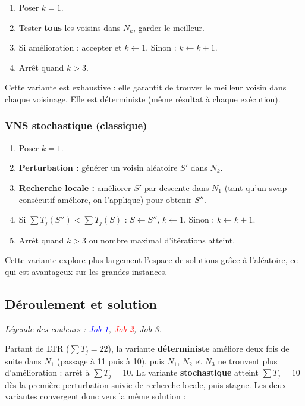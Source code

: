 \begin{enumerate}
    \item Poser $k = 1$.
    \item Tester \textbf{tous} les voisins dans $N_k$, garder le meilleur.
    \item Si amélioration : accepter et $k \leftarrow 1$. Sinon : $k \leftarrow k+1$.
    \item Arrêt quand $k > 3$.
\end{enumerate}

Cette variante est exhaustive : elle garantit de trouver le meilleur voisin dans chaque voisinage. Elle est déterministe (même résultat à chaque exécution).

\subsubsection{VNS stochastique (classique)}

\begin{enumerate}
    \item Poser $k = 1$.
    \item \textbf{Perturbation :} générer un voisin aléatoire $S'$ dans $N_k$.
    \item \textbf{Recherche locale :} améliorer $S'$ par descente dans $N_1$ (tant qu'un swap consécutif améliore, on l'applique) pour obtenir $S''$.
    \item Si $\sum T_j(S'') < \sum T_j(S)$ : $S \leftarrow S''$, $k \leftarrow 1$. Sinon : $k \leftarrow k+1$.
    \item Arrêt quand $k > 3$ ou nombre maximal d'itérations atteint.
\end{enumerate}

Cette variante explore plus largement l'espace de solutions grâce à l'aléatoire, ce qui est avantageux sur les grandes instances.

\subsection{Déroulement et solution}

\textit{Légende des couleurs : \textcolor{blue}{Job 1}, \textcolor{red}{Job 2}, \textcolor{green!70!black}{Job 3}.}

Partant de LTR ($\sum T_j = 22$), la variante \textbf{déterministe} améliore deux fois de suite dans $N_1$ (passage à 11 puis à 10), puis $N_1$, $N_2$ et $N_3$ ne trouvent plus d'amélioration : arrêt à $\sum T_j = 10$. La variante \textbf{stochastique} atteint $\sum T_j = 10$ dès la première perturbation suivie de recherche locale, puis stagne. Les deux variantes convergent donc vers la même solution :

